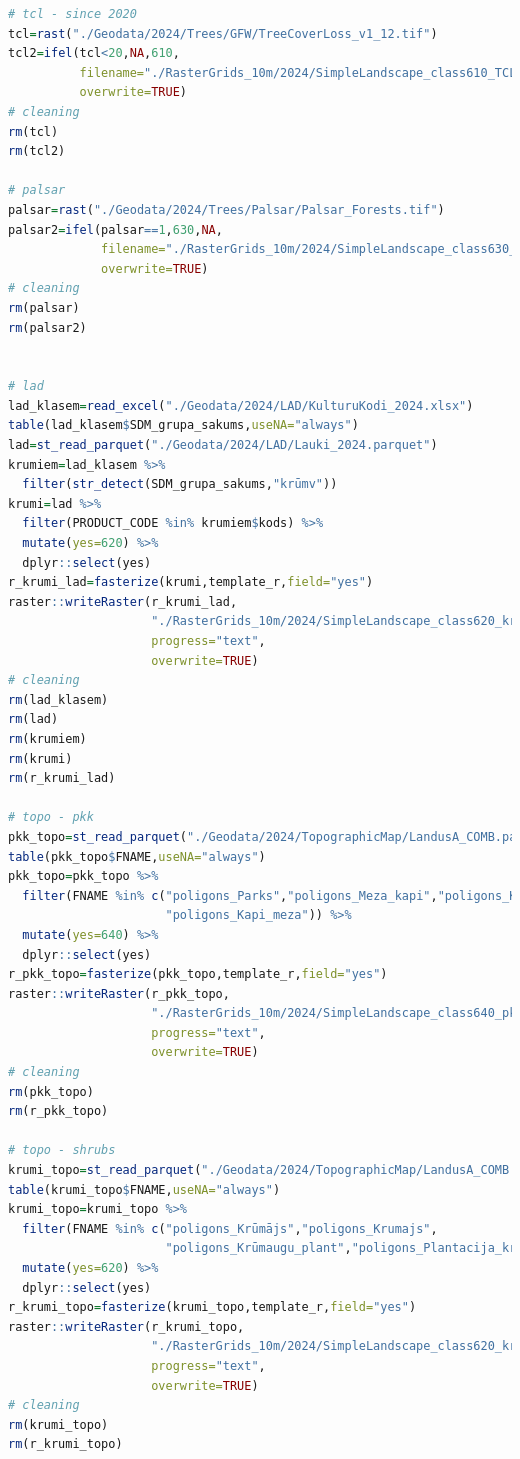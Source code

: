 \documentclass[
]{book}
\begin{document}
\begin{lstlisting}[language=R]
# tcl - since 2020
tcl=rast("./Geodata/2024/Trees/GFW/TreeCoverLoss_v1_12.tif")
tcl2=ifel(tcl<20,NA,610,
          filename="./RasterGrids_10m/2024/SimpleLandscape_class610_TCL.tif",
          overwrite=TRUE)
# cleaning
rm(tcl)
rm(tcl2)

# palsar
palsar=rast("./Geodata/2024/Trees/Palsar/Palsar_Forests.tif")
palsar2=ifel(palsar==1,630,NA,
             filename="./RasterGrids_10m/2024/SimpleLandscape_class630_Palsar.tif",
             overwrite=TRUE)
# cleaning
rm(palsar)
rm(palsar2)


# lad
lad_klasem=read_excel("./Geodata/2024/LAD/KulturuKodi_2024.xlsx")
table(lad_klasem$SDM_grupa_sakums,useNA="always")
lad=st_read_parquet("./Geodata/2024/LAD/Lauki_2024.parquet")
krumiem=lad_klasem %>% 
  filter(str_detect(SDM_grupa_sakums,"krūmv"))
krumi=lad %>% 
  filter(PRODUCT_CODE %in% krumiem$kods) %>% 
  mutate(yes=620) %>% 
  dplyr::select(yes)
r_krumi_lad=fasterize(krumi,template_r,field="yes")
raster::writeRaster(r_krumi_lad,
                    "./RasterGrids_10m/2024/SimpleLandscape_class620_krumi_lad.tif",
                    progress="text",
                    overwrite=TRUE)
# cleaning
rm(lad_klasem)
rm(lad)
rm(krumiem)
rm(krumi)
rm(r_krumi_lad)

# topo - pkk
pkk_topo=st_read_parquet("./Geodata/2024/TopographicMap/LandusA_COMB.parquet")
table(pkk_topo$FNAME,useNA="always")
pkk_topo=pkk_topo %>% 
  filter(FNAME %in% c("poligons_Parks","poligons_Meza_kapi","poligons_Kapi",
                      "poligons_Kapi_meza")) %>% 
  mutate(yes=640) %>% 
  dplyr::select(yes)
r_pkk_topo=fasterize(pkk_topo,template_r,field="yes")
raster::writeRaster(r_pkk_topo,
                    "./RasterGrids_10m/2024/SimpleLandscape_class640_pkk_topo.tif",
                    progress="text",
                    overwrite=TRUE)
# cleaning
rm(pkk_topo)
rm(r_pkk_topo)

# topo - shrubs
krumi_topo=st_read_parquet("./Geodata/2024/TopographicMap/LandusA_COMB.parquet")
table(krumi_topo$FNAME,useNA="always")
krumi_topo=krumi_topo %>% 
  filter(FNAME %in% c("poligons_Krūmājs","poligons_Krumajs",
                      "poligons_Krūmaugu_plant","poligons_Plantacija_krum")) %>% 
  mutate(yes=620) %>% 
  dplyr::select(yes)
r_krumi_topo=fasterize(krumi_topo,template_r,field="yes")
raster::writeRaster(r_krumi_topo,
                    "./RasterGrids_10m/2024/SimpleLandscape_class620_krumi_topo.tif",
                    progress="text",
                    overwrite=TRUE)
# cleaning
rm(krumi_topo)
rm(r_krumi_topo)


\end{lstlisting}
\end{document}
